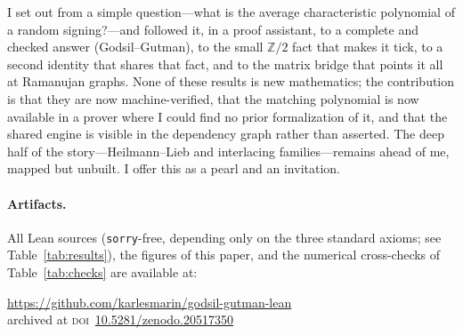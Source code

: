 \documentclass[11pt]{article}
\newcommand{\lean}[1]{\texttt{#1}}
\newcommand{\Z}{\mathbb{Z}}
\begin{document}
I set out from a simple question---what is the average characteristic
polynomial of a random signing?---and followed it, in a proof assistant, to a
complete and checked answer (Godsil--Gutman), to the small $\Z/2$ fact that
makes it tick, to a second identity that shares that fact, and to the matrix
bridge that points it all at Ramanujan graphs. None of these results is new
mathematics; the contribution is that they are now machine-verified, that the
matching polynomial is now available in a prover where I could find no prior
formalization of it, and that the shared engine is visible in the dependency
graph rather than asserted. The deep half
of the story---Heilmann--Lieb and interlacing families---remains ahead of me,
mapped but unbuilt. I offer this as a pearl and an invitation.

\paragraph{Artifacts.} All Lean sources (\lean{sorry}-free, depending only on the
three standard axioms; see Table~\ref{tab:results}), the figures of this paper,
and the numerical cross-checks of Table~\ref{tab:checks} are available at:
\begin{center}
\url{https://github.com/karlesmarin/godsil-gutman-lean}\\[2pt]
archived at \textsc{doi}~\href{https://doi.org/10.5281/zenodo.20517350}{10.5281/zenodo.20517350}
\end{center}



\end{document}
